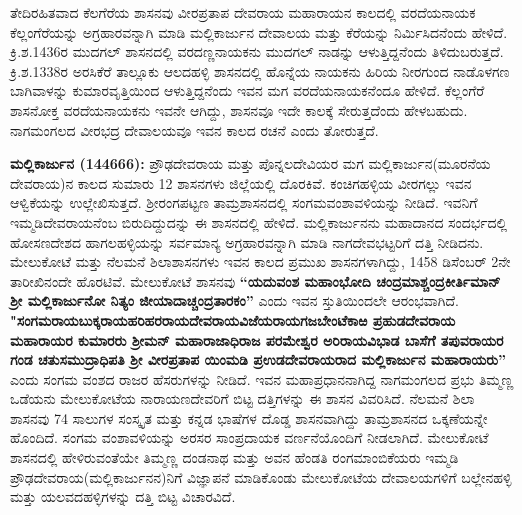 ತೇದಿರಹಿತವಾದ ಕೆಲಗೆರೆಯ ಶಾಸನವು ವೀರಪ್ರತಾಪ ದೇವರಾಯ ಮಹಾರಾಯನ ಕಾಲದಲ್ಲಿ ವರದೆಯನಾಯಕ ಕೆಲ್ಲಂಗೆರೆಯನ್ನು ಅಗ್ರಹಾರವನ್ನಾಗಿ ಮಾಡಿ ಮಲ್ಲಿಕಾರ್ಜುನ ದೇವಾಲಯ ಮತ್ತು ಕೆರೆಯನ್ನು ನಿರ್ಮಿಸಿದನೆಂದು ಹೇಳಿದೆ. ಕ್ರಿ.ಶ.1436ರ ಮುದಗಲ್​ ಶಾಸನದಲ್ಲಿ ವರದಣ್ಣನಾಯಕನು ಮುದಗಲ್​ ನಾಡನ್ನು ಆಳುತ್ತಿದ್ದನೆಂದು ತಿಳಿದುಬರುತ್ತದೆ. ಕ್ರಿ.ಶ.1338ರ ಅರಸಿಕೆರೆ ತಾಲ್ಲೂಕು ಆಲದಹಳ್ಳಿ ಶಾಸನದಲ್ಲಿ ಹೊನ್ನೆಯ ನಾಯಕನು ಹಿರಿಯ ನೀರಗುಂದ ನಾಡೊಳಗಣ ಬಾಗಿವಾಳನ್ನು ಕುಮಾರವೃತ್ತಿಯಿಂದ ಆಳುತ್ತಿದ್ದನೆಂದು ಇವನ ಮಗ ವರದೆಯನಾಯಕನೆಂದೂ ಹೇಳಿದೆ. ಕೆಲ್ಲಂಗೆರೆ ಶಾಸನೋಕ್ತ ವರದೆಯನಾಯಕನು ಇವನೇ ಆಗಿದ್ದು, ಶಾಸನವೂ ಇದೇ ಕಾಲಕ್ಕೆ ಸೇರುತ್ತದೆಂದು ಹೇಳಬಹುದು. ನಾಗಮಂಗಲದ ವೀರಭದ್ರ ದೇವಾಲಯವೂ ಇವನ ಕಾಲದ ರಚನೆ ಎಂದು ತೋರುತ್ತದೆ.

\textbf{ಮಲ್ಲಿಕಾರ್ಜುನ (1446\general{\enginline{-}}66): }ಪ್ರೌಢದೇವರಾಯ ಮತ್ತು ಪೊನ್ನಲದೇವಿಯರ ಮಗ ಮಲ್ಲಿಕಾರ್ಜುನ\break (ಮೂರನೆಯ ದೇವರಾಯ)ನ ಕಾಲದ ಸುಮಾರು 12 ಶಾಸನಗಳು ಜಿಲ್ಲೆಯಲ್ಲಿ ದೊರಕಿವೆ. ಕಂಚಿಗಹಳ್ಳಿಯ ವೀರಗಲ್ಲು ಇವನ ಆಳ್ವಿಕೆಯನ್ನು ಉಲ್ಲೇಖಿಸುತ್ತದೆ. ಶ‍್ರೀರಂಗಪಟ್ಟಣ ತಾಮ್ರಶಾಸನದಲ್ಲಿ ಸಂಗಮವಂಶಾವಳಿಯನ್ನು ನೀಡಿದೆ. ಇವನಿಗೆ ಇಮ್ಮಡಿದೇವರಾಯ\-ನೆಂಬ ಬಿರುದಿದ್ದುದನ್ನು ಈ ಶಾಸನದಲ್ಲಿ ಹೇಳಿದೆ. ಮಲ್ಲಿಕಾರ್ಜುನನು ಮಹಾದಾನದ ಸಂದರ್ಭದಲ್ಲಿ ಹೋಸಣದೇಶದ ಹಾಗಲಹಳ್ಳಿಯನ್ನು ಸರ್ವಮಾನ್ಯ ಅಗ್ರಹಾರವನ್ನಾಗಿ ಮಾಡಿ ನಾಗದೇವಭಟ್ಟರಿಗೆ ದತ್ತಿ ನೀಡಿದನು. ಮೇಲುಕೋಟೆ ಮತ್ತು ನೆಲಮನೆ ಶಿಲಾಶಾಸನಗಳು ಇವನ ಕಾಲದ ಪ್ರಮುಖ ಶಾಸನಗಳಾಗಿದ್ದು, 1458 ಡಿಸೆಂಬರ್​ 2ನೇ ತಾರೀಖಿನಂದೇ ಹೊರಟಿವೆ. ಮೇಲುಕೋಟೆ ಶಾಸನವು \textbf{“ಯದುವಂಶ ಮಹಾಂಭೋದಿ ಚಂದ್ರಮಾಶ್ಚಂದ್ರಕೀರ್ತಿಮಾನ್​ ಶ‍್ರೀ ಮಲ್ಲಿಕಾರ್ಜುನೋ ನಿತ್ಯಂ ಜೀಯಾದಾಚ್ಚಂದ್ರತಾರಕಂ”} ಎಂದು ಇವನ ಸ್ತುತಿಯಿಂದಲೇ ಆರಂಭವಾಗಿದೆ. \textbf{"ಸಂಗಮರಾಯ\general{\enginline{-}}ಬುಕ್ಕರಾಯ\general{\enginline{-}}ಹರಿಹರರಾಯ\general{\enginline{-}}ದೇವರಾಯ\general{\enginline{-}}ವಿಜೆಯರಾಯ\general{\enginline{-}}ಗಜಬೇಂಟೆಕಾಱ ಪ್ರಹುಡದೇವರಾಯ ಮಹಾರಾಯರ ಕುಮಾರರು ಶ‍್ರೀಮನ್​ ಮಹಾರಾಜಾಧಿರಾಜ ಪರಮೇಶ್ವರ ಅರಿರಾಯವಿಭಾಡ ಬಾಸೆಗೆ ತಪುವರಾಯರ ಗಂಡ ಚತುಸಮುದ್ರಾಧಿಪತಿ ಶ‍್ರೀ ವೀರಪ್ರತಾಪ ಯಿಂಮಡಿ ಪ್ರಉಡದೇವರಾಯ\-ರಾದ ಮಲ್ಲಿಕಾರ್ಜುನ ಮಹಾರಾಯರು”} ಎಂದು ಸಂಗಮ ವಂಶದ ರಾಜರ ಹೆಸರುಗಳನ್ನು ನೀಡಿದೆ. ಇವನ ಮಹಾಪ್ರಧಾನ\-ನಾಗಿದ್ದ ನಾಗಮಂಗಲದ ಪ್ರಭು ತಿಮ್ಮಣ್ಣ ಒಡೆಯನು ಮೇಲುಕೋಟೆಯ ನಾರಾಯಣದೇವರಿಗೆ ಬಿಟ್ಟ ದತ್ತಿಗಳನ್ನು ಈ ಶಾಸನ ವಿವರಿಸಿದೆ. ನೆಲಮನೆ ಶಿಲಾ ಶಾಸನವು 74 ಸಾಲುಗಳ ಸಂಸ್ಕೃತ ಮತ್ತು ಕನ್ನಡ ಭಾಷೆಗಳ ದೊಡ್ಡ ಶಾಸನವಾಗಿದ್ದು ತಾಮ್ರಶಾಸನದ ಒಕ್ಕಣೆಯನ್ನೇ ಹೊಂದಿದೆ. ಸಂಗಮ ವಂಶಾವಳಿಯನ್ನು ಅರಸರ ಸಾಂಪ್ರದಾಯಕ ವರ್ಣನೆಯೊಂದಿಗೆ ನೀಡಲಾಗಿದೆ. ಮೇಲುಕೋಟೆ ಶಾಸನದಲ್ಲಿ ಹೇಳಿರುವಂತೆಯೇ ತಿಮ್ಮಣ್ಣ ದಂಡನಾಥ ಮತ್ತು ಅವನ ಹೆಂಡತಿ ರಂಗಮಾಂಬಿಕೆಯರು ಇಮ್ಮಡಿ ಪ್ರೌಢದೇವರಾಯ(ಮಲ್ಲಿಕಾರ್ಜುನನ)ನಿಗೆ ವಿಜ್ಞಾಪನೆ ಮಾಡಿಕೊಂಡು ಮೇಲುಕೋಟೆಯ ದೇವಾಲಯಗಳಿಗೆ ಬಲ್ಲೇನಹಳ್ಳಿ ಮತ್ತು ಯಲವದಹಳ್ಳಿಗಳನ್ನು ದತ್ತಿ ಬಿಟ್ಟ ವಿಚಾರವಿದೆ.

